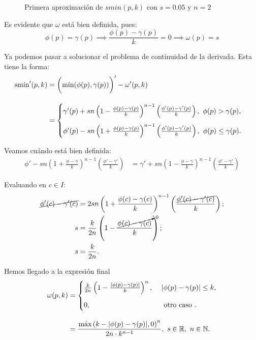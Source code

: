 \begin{figure}[!h]
\begin{minipage}[c]{0.49\linewidth}
        \caption{$k=0.1$}
     \end{minipage}
     \caption{Primera aproximación de $smin(p,k)$ con $s=0.05$ y $n=2$}
     \label{fig:smooth1}
\end{figure}

Es evidente que $\omega$ está bien definida, pues:
\begin{equation*}
    \phi(p)=\gamma(p) \implies \frac{\phi(p)-\gamma(p)}{k} = 0\implies \omega(p) = s
\end{equation*}

Ya podemos pasar a solucionar el problema de continuidad de la derivada. Esta tiene la forma:
\begin{align*}
    \smin'(p,k) &=  \bigg(\Min(\phi(p),\gamma(p))\bigg)' - \omega'(p,k)\\[10pt] &= \begin{cases}
        \gamma'(p) + sn\left(1-\frac{\phi(p)-\gamma(p)}{k}\right)^{n-1}\left(\frac{\phi'(p)-\gamma'(p)}{k}\right),\ \phi(p)>\gamma(p), \\[10pt] 
        \phi'(p) - sn\left(1+\frac{\phi(p)-\gamma(p)}{k}\right)^{n-1}\left(\frac{\phi'(p)-\gamma'(p)}{k}\right),\ \phi(p)\le \gamma(p).
    \end{cases}
\end{align*}

Veamos cuándo está bien definida:
\begin{align*}
    \phi' - sn\left(1+\frac{\phi-\gamma}{k}\right)^{n-1}\left(\frac{\phi'-\gamma'}{k}\right) &= \gamma' + sn\left(1-\frac{\phi-\gamma}{k}\right)^{n-1}\left(\frac{\phi'-\gamma'}{k}\right)
\end{align*}

Evaluando en $c\in I$:
\begin{align*}
    \cancel{\phi'(c) -  \gamma'(c)} &= 2sn\left(1+\frac{\phi(c)-\gamma(c)}{k}\right)^{n-1}\left(\frac{\cancel{\phi'(c)-\gamma'(c)}}{k}\right);\\
    s &= \frac{k}{2n}\left(1-\frac{\cancelto{0}{\phi(c)-\gamma(c)}}{k}\right);\\
    s &= \frac{k}{2n}.
\end{align*}
    
Hemos llegado a la expresión final
\begin{align*}
    \omega(p,k) &= \begin{cases}
        \frac{k}{2n}\left( 1-\frac{|\phi(p)-\gamma(p)|}{k} \right)^n,\ &|\phi(p)-\gamma(p)|\le k,\\[10pt]
        0,\ &\text{ otro caso }.
    \end{cases}\\[10pt] &= \frac{\Max\left( k - |\phi(p) - \gamma(p)|, 0\right)^n}{2n\cdot k^{n-1}}  ,\ s\in\R,\ n\in\N.
\end{align*}

